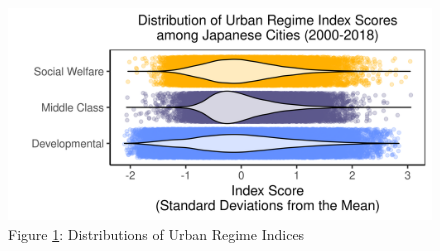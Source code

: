 \documentclass[preprint, 3p,
authoryear]{elsarticle} %
\begin{document}
\singlespacing

\newpage

\begin{landscape}

\setcounter{table}{0}
\renewcommand{\thetable}{A\arabic{table}}
\setcounter{figure}{0}
\renewcommand{\thefigure}{A\arabic{figure}}

\begin{figure}
\includegraphics[width=1\linewidth]{../viz/distribution} \caption{Figure \ref{fig:figure_A1}: \label{fig:figure_A1}{Distributions of Urban Regime Indices}}\label{fig:figure_A1}
\end{figure}

\end{landscape}
\end{document}
